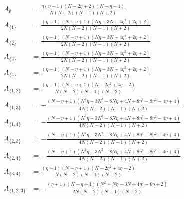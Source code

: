 \documentclass[11pt]{article}
\begin{document}
\begin{align*}
  A_{\emptyset} &= \frac{\eta \left(\eta - 1\right) \left(N - 2 \eta + 2\right) \left(N - \eta + 1\right)}{N \left(N - 2\right) \left(N - 1\right) \left(N + 2\right)} \\
  A_{\{1\}} &= \frac{\left(\eta - 1\right) \left(N - \eta + 1\right) \left(N \eta + 3 N - 4 \eta^{2} + 2 \eta + 2\right)}{2 N \left(N - 2\right) \left(N - 1\right) \left(N + 2\right)} \\
  A_{\{2\}} &= \frac{\left(\eta - 1\right) \left(N - \eta + 1\right) \left(N \eta + 3 N - 4 \eta^{2} + 2 \eta + 2\right)}{2 N \left(N - 2\right) \left(N - 1\right) \left(N + 2\right)} \\
  A_{\{3\}} &= \frac{\left(\eta - 1\right) \left(N - \eta + 1\right) \left(N \eta + 3 N - 4 \eta^{2} + 2 \eta + 2\right)}{2 N \left(N - 2\right) \left(N - 1\right) \left(N + 2\right)} \\
  A_{\{4\}} &= \frac{\left(\eta - 1\right) \left(N - \eta + 1\right) \left(N \eta + 3 N - 4 \eta^{2} + 2 \eta + 2\right)}{2 N \left(N - 2\right) \left(N - 1\right) \left(N + 2\right)} \\
  A_{\{1,2\}} &= \frac{\left(\eta + 1\right) \left(N - \eta + 1\right) \left(N - 2 \eta^{2} + 4 \eta - 2\right)}{N \left(N - 2\right) \left(N - 1\right) \left(N + 2\right)} \\
  A_{\{1,3\}} &= - \frac{\left(N - \eta + 1\right) \left(N^{2} \eta - 3 N^{2} - 8 N \eta + 4 N + 8 \eta^{3} - 8 \eta^{2} - 4 \eta + 4\right)}{4 N \left(N - 2\right) \left(N - 1\right) \left(N + 2\right)} \\
  A_{\{1,4\}} &= - \frac{\left(N - \eta + 1\right) \left(N^{2} \eta - 3 N^{2} - 8 N \eta + 4 N + 8 \eta^{3} - 8 \eta^{2} - 4 \eta + 4\right)}{4 N \left(N - 2\right) \left(N - 1\right) \left(N + 2\right)} \\
  A_{\{2,3\}} &= - \frac{\left(N - \eta + 1\right) \left(N^{2} \eta - 3 N^{2} - 8 N \eta + 4 N + 8 \eta^{3} - 8 \eta^{2} - 4 \eta + 4\right)}{4 N \left(N - 2\right) \left(N - 1\right) \left(N + 2\right)} \\
  A_{\{2,4\}} &= - \frac{\left(N - \eta + 1\right) \left(N^{2} \eta - 3 N^{2} - 8 N \eta + 4 N + 8 \eta^{3} - 8 \eta^{2} - 4 \eta + 4\right)}{4 N \left(N - 2\right) \left(N - 1\right) \left(N + 2\right)} \\
  A_{\{3,4\}} &= \frac{\left(\eta + 1\right) \left(N - \eta + 1\right) \left(N - 2 \eta^{2} + 4 \eta - 2\right)}{N \left(N - 2\right) \left(N - 1\right) \left(N + 2\right)} \\
  A_{\{1,2,3\}} &= - \frac{\left(\eta + 1\right) \left(N - \eta + 1\right) \left(N^{2} + N \eta - 3 N + 4 \eta^{2} - 6 \eta + 2\right)}{2 N \left(N - 2\right) \left(N - 1\right) \left(N + 2\right)} \\

\end{align*}
\end{document}
